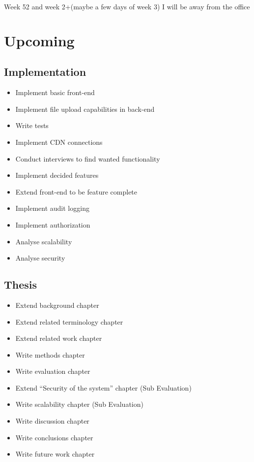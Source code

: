\documentclass[a4paper,12pt]{article}
\begin{document}
\begin{flushright}
\begin{gantt}{10}{6}

\end{gantt}

\tiny{Week 52 and week 2+(maybe a few days of week 3) I will be away from the office}
\end{flushright}
\newpage
\restoregeometry
\section{Upcoming}
    \subsection{Implementation}
    \begin{itemize}
        \item Implement basic front-end
        \item Implement file upload capabilities in back-end
        \item Write tests
        \item Implement CDN connections
        \item Conduct interviews to find wanted functionality
        \item Implement decided features
        \item Extend front-end to be feature complete
        \item Implement audit logging
        \item Implement authorization
        \item Analyse scalability
        \item Analyse security
    \end{itemize}
    
    \subsection{Thesis}
    \begin{itemize}
        \item Extend background chapter
        \item Extend related terminology chapter
        \item Extend related work chapter
        \item Write methods chapter
        \item Write evaluation chapter
        \item Extend ``Security of the system'' chapter (Sub Evaluation)
        \item Write scalability chapter (Sub Evaluation)
        \item Write discussion chapter
        \item Write conclusions chapter
        \item Write future work chapter
    \end{itemize}
\end{document}
